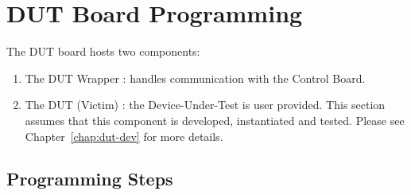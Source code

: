 \section{DUT Board Programming}
The DUT board hosts two components:
\begin{enumerate}
 \item The DUT Wrapper : handles communication with the Control Board.
 \item The DUT (Victim) : the Device-Under-Test is user provided. This section assumes that this component is developed, instantiated and tested. Please see Chapter~\ref{chap:dut-dev} for more details.
\end{enumerate}

\subsection {Programming Steps}
